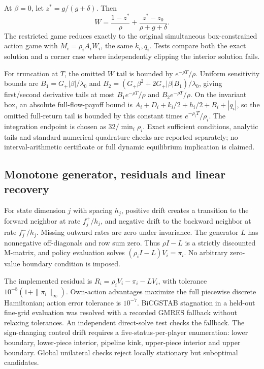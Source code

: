 \documentclass[11pt]{article}
\begin{document}
At $\beta=0$, let $z^*=g/(g+\delta)$. Then
\begin{equation}
 W=\frac{1-z^*}{\rho}+\frac{z^*-z_0}{\rho+g+\delta}.
\end{equation}
The restricted game reduces exactly to the original simultaneous box-constrained action game with $M_i=\rho_i A_iW_i$, the same $k_i,q_i$. Tests compare both the exact solution and a corner case where independently clipping the interior solution fails.

For truncation at $T$, the omitted $W$ tail is bounded by $e^{-\rho T}/\rho$. Uniform sensitivity bounds are $B_1=G_+|\beta|/\lambda_0$ and $B_2=(G_+\beta^2+2G_+|\beta|B_1)/\lambda_0$, giving first/second derivative tails at most $B_1e^{-\rho T}/\rho$ and $B_2e^{-\rho T}/\rho$. On the invariant box, an absolute full-flow-payoff bound is $A_i+D_i+k_i/2+h_i/2+B_i+|q_i|$, so the omitted full-return tail is bounded by this constant times $e^{-\rho_i T}/\rho_i$. The integration endpoint is chosen as $32/\min_i\rho_i$. Exact sufficient conditions, analytic tails and standard numerical quadrature checks are reported separately; no interval-arithmetic certificate or full dynamic equilibrium implication is claimed.

\subsection{Monotone generator, residuals and linear recovery}
For state dimension $j$ with spacing $h_j$, positive drift creates a transition to the forward neighbor at rate $f_j^+/h_j$, and negative drift to the backward neighbor at rate $f_j^-/h_j$. Missing outward rates are zero under invariance. The generator $L$ has nonnegative off-diagonals and row sum zero. Thus $\rho I-L$ is a strictly discounted M-matrix, and policy evaluation solves $(\rho_iI-L)V_i=\pi_i$. No arbitrary zero-value boundary condition is imposed.

The implemented residual is $R_i=\rho_iV_i-\pi_i-LV_i$, with tolerance $10^{-8}(1+\|\pi_i\|_\infty)$. Own-action advantages maximize the full piecewise discrete Hamiltonian; action error tolerance is $10^{-7}$. BiCGSTAB stagnation in a held-out fine-grid evaluation was resolved with a recorded GMRES fallback without relaxing tolerances. An independent direct-solve test checks the fallback. The sign-changing control drift requires a five-status-per-player enumeration: lower boundary, lower-piece interior, pipeline kink, upper-piece interior and upper boundary. Global unilateral checks reject locally stationary but suboptimal candidates.
\end{document}
